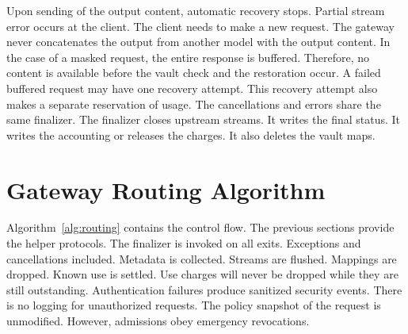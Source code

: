 \documentclass{FastFyp}
\begin{document}
Upon sending of the output content, automatic recovery stops.
Partial stream error occurs at the client.
The client needs to make a new request.
The gateway never concatenates the output from another model with the output content.
In the case of a masked request, the entire response is buffered.
Therefore, no content is available before the vault check and the restoration occur.
A failed buffered request may have one recovery attempt.
This recovery attempt also makes a separate reservation of usage.
The cancellations and errors share the same finalizer.
The finalizer closes upstream streams.
It writes the final status.
It writes the accounting or releases the charges.
It also deletes the vault maps.

\section{Gateway Routing Algorithm}
\label{sec:algorithm}
Algorithm~\ref{alg:routing} contains the control flow.
The previous sections provide the helper protocols.
The finalizer is invoked on all exits.
Exceptions and cancellations included.
Metadata is collected.
Streams are flushed.
Mappings are dropped.
Known use is settled.
Use charges will never be dropped while they are still outstanding.
Authentication failures produce sanitized security events.
There is no logging for unauthorized requests.
The policy snapshot of the request is unmodified.
However, admissions obey emergency revocations.
\end{document}
